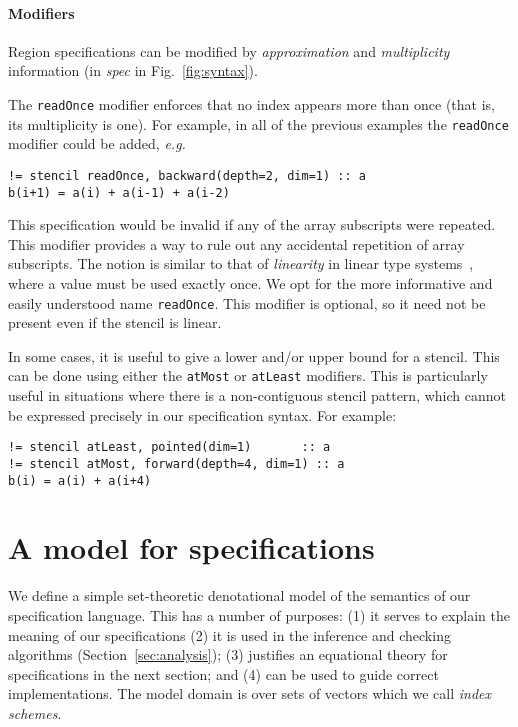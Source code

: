 \documentclass[10pt,preprint]{sigplanconf}
\theoremstyle{definition}
\newcommand{\eg}{\emph{e.g.}}
\newcommand{\term}[1]{\texttt{#1}}
\begin{document}
\paragraph{Modifiers}
Region specifications can be modified
by \emph{approximation} and \emph{multiplicity} information
(in \textit{spec} in Fig.~\ref{fig:syntax}).

The \texttt{readOnce} modifier enforces that no index appears more
than once (that is, its multiplicity is one). For example, in all of
the previous examples the \texttt{readOnce} modifier could be added,
\eg{}
%
\begin{verbatim}
!= stencil readOnce, backward(depth=2, dim=1) :: a
b(i+1) = a(i) + a(i-1) + a(i-2)
\end{verbatim}
%
This specification would be invalid if any of the
array subscripts were repeated. This modifier provides a way to
rule out any accidental repetition of array subscripts.
The notion is similar to that of \emph{linearity} in linear type
systems~\cite{wadler1990linear}, where a value must be used
exactly once. We opt for the more informative and easily understood name
\texttt{readOnce}. This modifier is optional, so it need not
be present even if the stencil is linear.

In some cases, it is useful to give a lower and/or upper bound for a
stencil. This can be done using either the \term{atMost} or
\term{atLeast} modifiers. This is particularly useful in situations
where there is a non-contiguous stencil pattern, which cannot be expressed
precisely in our specification syntax. For example:
%
\begin{verbatim}
!= stencil atLeast, pointed(dim=1)       :: a
!= stencil atMost, forward(depth=4, dim=1) :: a
b(i) = a(i) + a(i+4)
\end{verbatim}

\section{A model for specifications}
\label{sec:semantics}

We define a simple set-theoretic denotational model of the semantics
of our specification language. This has a number of purposes:
(1) it serves to explain the meaning of our specifications
(2) it is used in the inference and checking algorithms
(Section~\ref{sec:analysis}); (3) justifies an equational theory for
specifications in the next section; and (4) can be used to guide
correct implementations. The model domain is over sets of vectors
which we call \emph{index schemes}.
\end{document}
